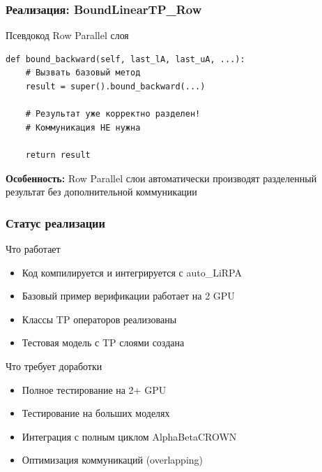 \begin{frame}[fragile]
\frametitle{Реализация: BoundLinearTP\_Row}

\begin{block}{Псевдокод Row Parallel слоя}
\begin{verbatim}
def bound_backward(self, last_lA, last_uA, ...):
    # Вызвать базовый метод
    result = super().bound_backward(...)

    # Результат уже корректно разделен!
    # Коммуникация НЕ нужна

    return result
\end{verbatim}
\end{block}

\vspace{0.3cm}

\textbf{Особенность:} Row Parallel слои автоматически производят разделенный результат без дополнительной коммуникации

\end{frame}

\begin{frame}
\frametitle{Статус реализации}

\begin{block}{Что работает}
\begin{itemize}
    \item[\checkmark] Код компилируется и интегрируется с auto\_LiRPA
    \item[\checkmark] Базовый пример верификации работает на 2 GPU
    \item[\checkmark] Классы TP операторов реализованы
    \item[\checkmark] Тестовая модель с TP слоями создана
\end{itemize}
\end{block}

\vspace{0.3cm}

\begin{alertblock}{Что требует доработки}
\begin{itemize}
    \item Полное тестирование на 2+ GPU
    \item Тестирование на больших моделях
    \item Интеграция с полным циклом AlphaBetaCROWN
    \item Оптимизация коммуникаций (overlapping)
\end{itemize}
\end{alertblock}

\end{frame}
